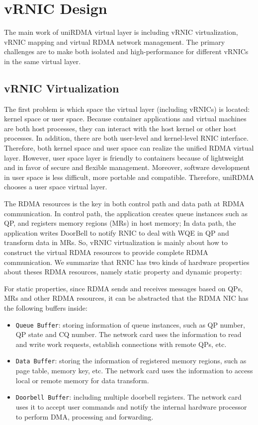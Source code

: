 \section{vRNIC Design}
The main work of uniRDMA virtual layer is including vRNIC virtualization, vRNIC mapping and virtual RDMA network management. The primary challenges are to make both isolated and high-performance for different vRNICs in the same virtual layer. 

\subsection{vRNIC Virtualization}
The first problem is which space the virtual layer (including vRNICs) is located: kernel space or user space. Because container applications and virtual machines are both host processes, they can interact with the host kernel or other host processes. In addition, there are both user-level and kernel-level RNIC interface. Therefore, both kernel space and user space can realize the unified RDMA virtual layer. However, user space layer is friendly to containers because of lightweight and in favor of secure and flexible management. Moreover, software development in user space is less difficult, more portable and compatible. Therefore, uniRDMA chooses a user space virtual layer.

The RDMA resources is the key in both control path and data path at RDMA communication. In control path, the application creates queue instances such as QP, and registers memory regions (MRs) in host memory; In data path, the application writes DoorBell to notify RNIC to deal with WQE in QP and transform data in MRs. So, vRNIC virtualization is mainly about how to construct the virtual RDMA resources to provide complete RDMA communication. We summarize that RNIC has two kinds of hardware properties about theses RDMA resources, namely static property and dynamic property:

For static properties, since RDMA sends and receives messages based on QPs, MRs and other RDMA resources, it can be abstracted that the RDMA NIC has the following buffers inside:

\begin{itemize}
	\item {\verb|Queue Buffer|}: storing information of queue instances, such as QP number, QP state and CQ number. The network card uses the information to read and write work requests, establish connections with remote QPs, etc.  
	\item {\verb|Data Buffer|}: storing the information of registered memory regions, such as page table, memory key, etc. The network card uses the information to access local or remote memory for data transform.  
	\item {\verb|Doorbell Buffer|}: including multiple doorbell registers. The network card uses it to accept user commands and notify the internal hardware processor to perform DMA, processing and forwarding. 
\end{itemize}

